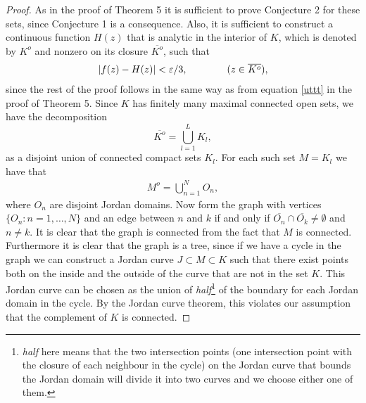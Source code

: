 \documentclass[11pt]{article}
\begin{document}
\begin{proof}
  As in the proof of Theorem 5 it is sufficient to prove Conjecture 2 for these sets, since Conjecture 1 is a consequence. 
Also, it is sufficient to construct a continuous function $H(z)$ that is analytic in the interior of $K$, which is denoted by $K^o$ and nonzero on its closure $\overline{K^o}$, such that
\begin{gather} \label{aj}
 \abs{f(z)-H(z)}<\varepsilon/3, \qquad  \qquad (z \in \overline{K^o}),
\end{gather}
since the rest of the proof follows in the same way as from  equation \eqref{uttt} in the proof of Theorem 5.  
Since $K$ has finitely many maximal connected open sets, we have  the decomposition
$$
 \overline{K^o}=\bigcup_{l=1}^L K_l,
$$
as a disjoint union of connected compact sets $K_l$. For each such set $M= K_l$ we have that
\begin{gather} \label{ajaj} M^o=\bigcup_{n=1}^{N} O_{n}, \end{gather}
where $O_n$ are disjoint Jordan domains. 
Now form the graph with vertices $\{O_n:n=1,\ldots, N\}$ and an edge between $n$ and $k$ if and only if $\overline{O_n} \cap \overline{O_k} \neq \emptyset$ and $n \neq k$. It is clear that the graph is connected from the fact that $M$ is connected. Furthermore it is clear that the graph is a tree, since if we have a cycle in the graph we can construct
a Jordan curve $J \subset M \subset K$ such that there exist points both on the inside and the outside of the curve that are not in the set $K$.  This Jordan curve can be chosen as the union of {\em half}\footnote{{\em half} here means that the two intersection points (one intersection point with the closure of each neighbour in the cycle) on the Jordan curve that bounds the Jordan domain will divide it into two curves and we choose either one of them.} of the boundary for each Jordan domain in the cycle. 
By the Jordan curve theorem, this  violates our assumption that the complement of $K$ is connected.


\end{proof}
\end{document}
